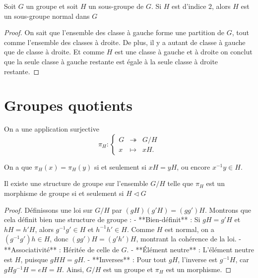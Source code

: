 \begin{proposition}
        Soit $G$ un groupe et soit $H$ un sous-groupe de $G$.
        Si $H$ est d'indice $2$, alors $H$ est un sous-groupe normal dans $G$
\end{proposition}

\begin{proof}
On sait que l'ensemble des classe à gauche forme une partition de $G$, tout comme l'ensemble des classes à droite.
De plus, il y a autant de classe à gauche que de classe à droite. Et comme $H$ est une classe à gauche et à droite on conclut que la seule classe à gauche restante est égale à la seule classe à droite restante.
\end{proof}

\section{Groupes quotients}

\begin{definition}
    On a une application surjective
\[
\pi_H : \left\{
\begin{array}{ccc}
    G & \twoheadrightarrow & G/H \\
    x & \mapsto & xH.
\end{array}
\right.
\]

On a que \( \pi_H(x) = \pi_H(y) \) si et seulement si \( xH = yH \), ou encore \( x^{-1} y \in H \).
\end{definition}

\begin{theoreme}
    Il existe une structure de groupe sur l’ensemble $G/H$ telle que $\pi_H$ est un morphisme de groupe si et seulement si $H\triangleleft G$
\end{theoreme}

\begin{proof}
    Définissons une loi sur \( G/H \) par \( (gH) (g'H) = (gg')H \). Montrons que cela définit bien une structure de groupe :
- **Bien-définit** : Si \( gH = g'H \) et \( hH = h'H \), alors \( g^{-1} g' \in H \) et \( h^{-1} h' \in H \). Comme \( H \) est normal, on a \( (g^{-1} g') h \in H \), donc \( (gg') H = (g'h') H \), montrant la cohérence de la loi.
- **Associativité** : Héritée de celle de \( G \).
- **Élément neutre** : L'élément neutre est \( H \), puisque \( gH H = gH \).
- **Inverses** : Pour tout \( gH \), l'inverse est \( g^{-1}H \), car \( gH g^{-1}H = eH = H \).
Ainsi, \( G/H \) est un groupe et \( \pi_H \) est un morphisme.
\end{proof}

